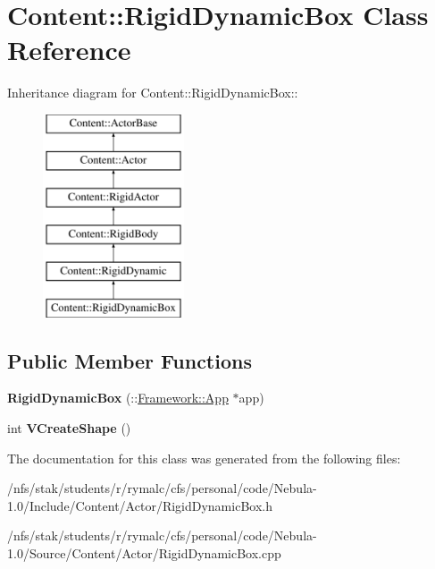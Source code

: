 \hypertarget{classContent_1_1RigidDynamicBox}{
\section{Content::RigidDynamicBox Class Reference}
\label{classContent_1_1RigidDynamicBox}
}
Inheritance diagram for Content::RigidDynamicBox::\begin{figure}[H]
\begin{center}
\leavevmode
\includegraphics[height=6cm]{classContent_1_1RigidDynamicBox}
\end{center}
\end{figure}
\subsection*{Public Member Functions}
\begin{DoxyCompactItemize}
\item 
\hypertarget{classContent_1_1RigidDynamicBox_adcbd63e083f12f7db6c9fa911804d009}{
{\bfseries RigidDynamicBox} (::\hyperlink{classFramework_1_1App}{Framework::App} $\ast$app)}
\label{classContent_1_1RigidDynamicBox_adcbd63e083f12f7db6c9fa911804d009}

\item 
\hypertarget{classContent_1_1RigidDynamicBox_ae7fba26e2966298aec736b5377ebeb46}{
int {\bfseries VCreateShape} ()}
\label{classContent_1_1RigidDynamicBox_ae7fba26e2966298aec736b5377ebeb46}

\end{DoxyCompactItemize}


The documentation for this class was generated from the following files:\begin{DoxyCompactItemize}
\item 
/nfs/stak/students/r/rymalc/cfs/personal/code/Nebula-\/1.0/Include/Content/Actor/RigidDynamicBox.h\item 
/nfs/stak/students/r/rymalc/cfs/personal/code/Nebula-\/1.0/Source/Content/Actor/RigidDynamicBox.cpp\end{DoxyCompactItemize}
